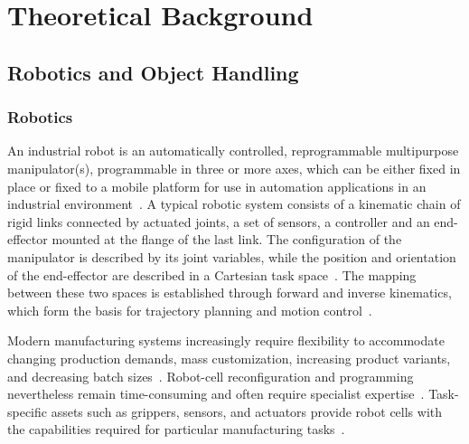 \chapter{Theoretical Background}
\label{sec:theoretical_background}

\section{Robotics and Object Handling}
\label{subsec:robotics_and_handling}

\subsection{Robotics}
\label{subsubsec:robotics}

An industrial robot is an automatically controlled, reprogrammable multipurpose manipulator(s), programmable in
three or more axes, which can be either fixed in place or fixed to a mobile platform for use
in automation applications in an industrial environment~\cite{Lee2022Vocabulary}. A typical robotic system consists of a kinematic chain of rigid links
connected by actuated joints, a set of sensors, a controller and an end-effector mounted at the flange of the last link. The configuration of the
manipulator is described by its joint variables, while the position and orientation of the end-effector are described in a Cartesian task
space~\cite{Malik2022A}. The mapping between these two spaces is established through forward and inverse kinematics, which form the basis for
trajectory planning and motion control~\cite{Singh2022Kinematics}.

Modern manufacturing systems increasingly require flexibility to accommodate
changing production demands, mass customization, increasing product variants,
and decreasing batch sizes~\cite{Wiese2022Flexible,Bilancia2023An}. Robot-cell
reconfiguration and programming nevertheless remain time-consuming and often
require specialist expertise~\cite{Wiese2022Flexible}. Task-specific assets such
as grippers, sensors, and actuators provide robot cells with the capabilities
required for particular manufacturing tasks~\cite{Wiese2022Flexible}.



